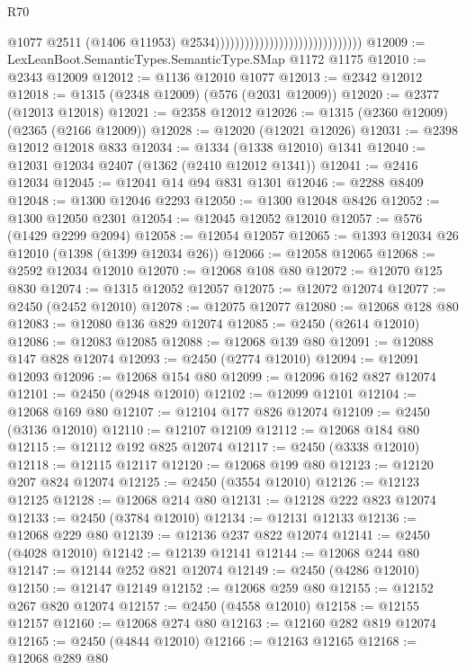 \begin{lexlean}{R70}
\begin{coremodule}
                                                                @1077
                                                                @2511
                                                                (@1406 @11953)
                                                                @2534))))))))))))))))))))))))))))))
@12009 := LexLeanBoot.SemanticTypes.SemanticType.SMap @1172 @1175
@12010 := @2343 @12009
@12012 := @1136 @12010 @1077
@12013 := @2342 @12012
@12018 := @1315 (@2348 @12009) (@576 (@2031 @12009))
@12020 := @2377 (@12013 @12018)
@12021 := @2358 @12012
@12026 := @1315 (@2360 @12009) (@2365 (@2166 @12009))
@12028 := @12020 (@12021 @12026)
@12031 := @2398 @12012 @12018 @833
@12034 := @1334 (@1338 @12010) @1341
@12040 := @12031 @12034 @2407 (@1362 (@2410 @12012 @1341))
@12041 := @2416 @12034
@12045 := @12041 @14 @94 @831 @1301
@12046 := @2288 @8409
@12048 := @1300 @12046 @2293
@12050 := @1300 @12048 @8426
@12052 := @1300 @12050 @2301
@12054 := @12045 @12052 @12010
@12057 := @576 (@1429 @2299 @2094)
@12058 := @12054 @12057
@12065 := @1393 @12034 @26 @12010 (@1398 (@1399 @12034 @26))
@12066 := @12058 @12065
@12068 := @2592 @12034 @12010
@12070 := @12068 @108 @80
@12072 := @12070 @125 @830
@12074 := @1315 @12052 @12057
@12075 := @12072 @12074
@12077 := @2450 (@2452 @12010)
@12078 := @12075 @12077
@12080 := @12068 @128 @80
@12083 := @12080 @136 @829 @12074
@12085 := @2450 (@2614 @12010)
@12086 := @12083 @12085
@12088 := @12068 @139 @80
@12091 := @12088 @147 @828 @12074
@12093 := @2450 (@2774 @12010)
@12094 := @12091 @12093
@12096 := @12068 @154 @80
@12099 := @12096 @162 @827 @12074
@12101 := @2450 (@2948 @12010)
@12102 := @12099 @12101
@12104 := @12068 @169 @80
@12107 := @12104 @177 @826 @12074
@12109 := @2450 (@3136 @12010)
@12110 := @12107 @12109
@12112 := @12068 @184 @80
@12115 := @12112 @192 @825 @12074
@12117 := @2450 (@3338 @12010)
@12118 := @12115 @12117
@12120 := @12068 @199 @80
@12123 := @12120 @207 @824 @12074
@12125 := @2450 (@3554 @12010)
@12126 := @12123 @12125
@12128 := @12068 @214 @80
@12131 := @12128 @222 @823 @12074
@12133 := @2450 (@3784 @12010)
@12134 := @12131 @12133
@12136 := @12068 @229 @80
@12139 := @12136 @237 @822 @12074
@12141 := @2450 (@4028 @12010)
@12142 := @12139 @12141
@12144 := @12068 @244 @80
@12147 := @12144 @252 @821 @12074
@12149 := @2450 (@4286 @12010)
@12150 := @12147 @12149
@12152 := @12068 @259 @80
@12155 := @12152 @267 @820 @12074
@12157 := @2450 (@4558 @12010)
@12158 := @12155 @12157
@12160 := @12068 @274 @80
@12163 := @12160 @282 @819 @12074
@12165 := @2450 (@4844 @12010)
@12166 := @12163 @12165
@12168 := @12068 @289 @80

\end{coremodule}
\end{lexlean}
